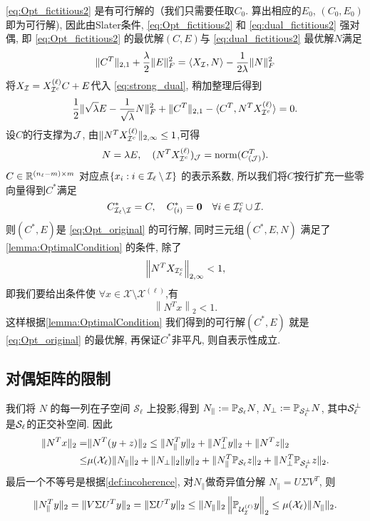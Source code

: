 \eqref{eq:Opt_fictitious2} 是有可行解的（我们只需要任取\(C_0\).
算出相应的\(E_0\), \((C_0, E_0)\)即为可行解), 因此由Slater条件\cite{boyd2004convex},
 \eqref{eq:Opt_fictitious2} 和 \eqref{eq:dual_fictitious2} 强对偶,
即 \eqref{eq:Opt_fictitious2} 的最优解\((C, E)\)与 \eqref{eq:dual_fictitious2} 最优解\(N\)满足
\begin{align}\label{eq:strong_dual}
  \|C^T\|_{2,1}+\frac{\lambda}{2}\|E\|_F^2 = \langle X_{\mathcal{I}},N \rangle -
  \frac{1}{2\lambda} \|N\|_F^2   
\end{align}
将\(X_{\mathcal{I}}=X^{(\ell)}_{\mathcal{I}^c}C+E\)代入 \eqref{eq:strong_dual},   稍加整理后得到
\[ \frac{1}{2}\| \sqrt{\lambda}E-\frac{1}{\sqrt{\lambda}}N \|_F^2+
\|C^T\|_{2,1}-\langle C^T, N^T X^{(\ell)}_{\mathcal{I}^c}\rangle = 0. \]
设\(C\)的行支撑为\(\mathcal{J}\), 由\(\|N^T X^{(\ell)}_{\mathcal{I}^c}\|_{2, \infty} \leq 1\),可得
\begin{align*}
  N=\lambda E, \quad (N^T X^{(\ell)}_{\mathcal{I}^c})_{\mathcal{J}} =\operatorname{norm}(C_{(\mathcal{J})}^T).
\end{align*}
\(C\in \mathbb{R}^{(n_\ell-m)\times m}\) 对应点\(\{ x_i: i \in \mathcal{I}_\ell \setminus \mathcal{I}\}\)
的表示系数, 所以我们将\(C\)按行扩充一些零向量得到\(C^*\)满足
\[ C^*_{\mathcal{I}_\ell \setminus \mathcal{I}} = C, \quad C^*_{(i)} = \mathbf{0}
\quad \forall i \in \mathcal{I}^c_\ell \cup \mathcal{I}. \]
则\((C^*, E)\)是 \eqref{eq:Opt_original} 的可行解, 同时三元组\((C^*, E, N)\)
满足了\autoref{lemma:OptimalCondition} 的条件, 除了
\begin{equation*}
  \left\|N^T X_{\mathcal{I}_\ell^c}\right\|_{2,\infty}<1,
\end{equation*}
即我们要给出条件使 \(\forall x \in \mathcal{X}\setminus \mathcal{X}^{(\ell)}\),有
\begin{equation}\label{eq:dual_separation_condition}
   \left \| N^T x\right \|_2 < 1.
\end{equation}
这样根据\autoref{lemma:OptimalCondition} 我们得到的可行解\((C^*, E)\)
就是 \eqref{eq:Opt_original} 的最优解, 再保证\(C^*\)非平凡, 则自表示性成立.

\subsection{对偶矩阵的限制}\label{sec:dual_separation}
我们将 \(N\) 的每一列在子空间 \(\mathcal{S}_{\ell}\) 上投影,得到 \(N_{\parallel}
:=\mathbb{P}_{\mathcal{S}_\ell}N\), \(N_{\perp} := \mathbb{P}_{\mathcal{S}_{\ell}^\perp}N\),
其中\(\mathcal{S}_\ell^\perp\)是\(\mathcal{S}_\ell\)的正交补空间. 因此
\begin{align}\label{eq:showing_dual_sep_cond}
  \| N^T x \|_2 =& \| N^T (y+z)\|_2 \leq \| N_{\parallel}^T y\|_2+\|
  N_{\perp}^T y\|_2+\|N^T z\|_2 \nonumber\\
  \leq& \mu(\mathcal{X}_{\ell}) \|N_{\parallel}\|_2 + \|N_{\perp}\|_2\|y\|_2
  + \|N_{\parallel}^T \mathbb{P}_{\mathcal{S}_{\ell}} z\|_2 
  + \|N_\perp^T \mathbb{P}_{\mathcal{S}_\ell^\perp} z\|_2 .
\end{align}
最后一个不等号是根据\autoref{def:incoherence},   对\(N_\parallel\)做奇异值分解
\(N_\parallel = U\Sigma V^T\), 则
\[
  \|N_\parallel^T y\|_2 = \|V \Sigma U^T y\|_2 = \|\Sigma U^T y\|_2 \le
  \|N_\parallel\|_2 \left\|\mathbb{P}_{\mathcal{U}_{\mathcal{I}}^{(\ell)}} y\right\|_2 \le \mu(\mathcal{X}_\ell)
  \|N_\parallel\|_2.
\]


